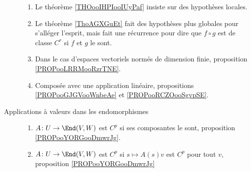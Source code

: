 \begin{description}
		\begin{enumerate}
			\item
			      Le théorème \ref{THOooIHPIooIUyPaf} insiste sur des hypothèses locales.
			\item
			      Le théorème \ref{ThoAGXGuEt} fait des hypothèses plus globales pour s'alléger l'esprit, mais fait une récurrence pour dire que \( f\circ g\) est de classe \( C^r\) si \( f\) et \( g\) le sont.
			\item
			      Dans le cas d'espaces vectoriels normés de dimension finie, proposition \ref{PROPooLRRMooRzrTNE}.
			\item
			      Composée avec une application linéaire, propositions \ref{PROPooGJGVooWnbeAe} et \ref{PROPooRCZOooSgvpSE}.
		\end{enumerate}
	\item[Applications à valeurs dans les endomorphismes]
		\begin{enumerate}
			\item
			      \(A \colon U\to \End(V,W)  \) est \( C^p\) si ses composantes le sont, proposition \ref{PROPooYORGooDmwrJg}.
			\item
			      \(A \colon U\to \End(V,W)  \) est \( C^p\) si \( s\mapsto A(s)v\) est \( C^p\) pour tout \( v\), proposition \ref{PROPooYORGooDmwrJg}
		\end{enumerate}
\end{description}
